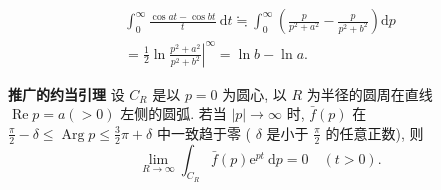 $$
\begin{gathered}
\int_0^{\infty} \frac{\cos a t-\cos b t}{t} \mathrm{~d} t \fallingdotseq \int_0^{\infty}\left(\frac{p}{p^2+a^2}-\frac{p}{p^2+b^2}\right) \mathrm{d} p \\
=\left.\frac{1}{2} \ln \frac{p^2+a^2}{p^2+b^2}\right|^{\infty}=\ln b-\ln a .
\end{gathered}
$$

\textbf{推广的约当引理} 设 $C_R$ 是以 $p=0$ 为圆心, 以 $R$ 为半径的圆周在直线 $\operatorname{Re} p=a(>0)$ 左侧的圆弧. 若当 $|p| \rightarrow \infty$ 时, $\bar{f}(p)$ 在 $\frac{\pi}{2}-\delta \leqslant \operatorname{Arg} p \leqslant \frac{3}{2} \pi+\delta$ 中一致趋于零 ( $\delta$ 是小于 $\frac{\pi}{2}$ 的任意正数), 则
$$
\lim _{R \rightarrow \infty} \int_{C_R} \bar{f}(p) \mathrm{e}^{p t} \mathrm{~d} p=0 \quad(t>0) .
$$